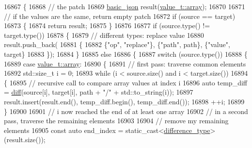 \begin{DoxyCode}
16867     \{
16868         \textcolor{comment}{// the patch}
16869         \hyperlink{classnlohmann_1_1basic__json_aed115142bd0c6c66c864700e0467df55}{basic\_json} result(\hyperlink{namespacenlohmann_1_1detail_a1ed8fc6239da25abcaf681d30ace4985af1f713c9e000f5d3f280adbd124df4f5}{value\_t::array});
16870 
16871         \textcolor{comment}{// if the values are the same, return empty patch}
16872         \textcolor{keywordflow}{if} (source == target)
16873         \{
16874             \textcolor{keywordflow}{return} result;
16875         \}
16876 
16877         \textcolor{keywordflow}{if} (source.type() != target.type())
16878         \{
16879             \textcolor{comment}{// different types: replace value}
16880             result.push\_back(
16881             \{
16882                 \{\textcolor{stringliteral}{"op"}, \textcolor{stringliteral}{"replace"}\}, \{\textcolor{stringliteral}{"path"}, path\}, \{\textcolor{stringliteral}{"value"}, target\}
16883             \});
16884         \}
16885         \textcolor{keywordflow}{else}
16886         \{
16887             \textcolor{keywordflow}{switch} (source.type())
16888             \{
16889                 \textcolor{keywordflow}{case} \hyperlink{namespacenlohmann_1_1detail_a1ed8fc6239da25abcaf681d30ace4985af1f713c9e000f5d3f280adbd124df4f5}{value\_t::array}:
16890                 \{
16891                     \textcolor{comment}{// first pass: traverse common elements}
16892                     std::size\_t i = 0;
16893                     \textcolor{keywordflow}{while} (i < source.size() and i < target.size())
16894                     \{
16895                         \textcolor{comment}{// recursive call to compare array values at index i}
16896                         \textcolor{keyword}{auto} temp\_diff = \hyperlink{classnlohmann_1_1basic__json_a543bd5f7490de54c875b2c0912dc9a49}{diff}(source[i], target[i], path + \textcolor{stringliteral}{"/"} + std::to\_string(i));
16897                         result.insert(result.end(), temp\_diff.begin(), temp\_diff.end());
16898                         ++i;
16899                     \}
16900 
16901                     \textcolor{comment}{// i now reached the end of at least one array}
16902                     \textcolor{comment}{// in a second pass, traverse the remaining elements}
16903 
16904                     \textcolor{comment}{// remove my remaining elements}
16905                     \textcolor{keyword}{const} \textcolor{keyword}{auto} end\_index = \textcolor{keyword}{static\_cast<}\hyperlink{classnlohmann_1_1basic__json_afe7c1303357e19cea9527af4e9a31d8f}{difference\_type}\textcolor{keyword}{>}(result.size());

\end{DoxyCode}
